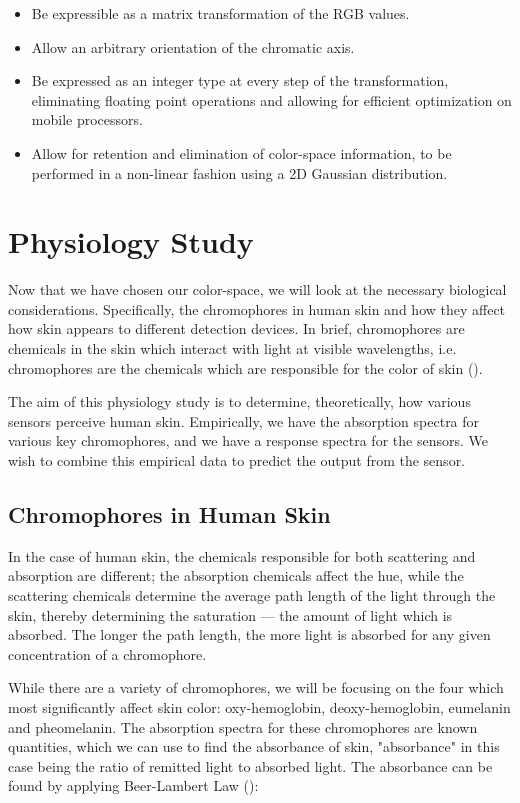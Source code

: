 \begin{itemize}
\item Be expressible as a matrix transformation of the RGB values.
\item Allow an arbitrary orientation of the chromatic axis.
\item Be expressed as an integer type at every step of the transformation, eliminating floating point operations and allowing for efficient optimization on mobile processors.
\item Allow for retention and elimination of color-space information, to be performed in a non-linear fashion using a 2D Gaussian distribution.
\end{itemize}


\section{Physiology Study}\label{sec:PhysiologyStudy}

Now that we have chosen our color-space, we will look at the necessary biological considerations. Specifically, the chromophores in human skin and how they affect how skin appears to different detection devices. In brief, chromophores are chemicals in the skin which interact with light at visible wavelengths, i.e. chromophores are the chemicals which are responsible for the color of skin (\cite{Anderson1981}).

The aim of this physiology study is to determine, theoretically, how various sensors perceive human skin. Empirically, we have the absorption spectra for various key chromophores, and we have a response spectra for the sensors. We wish to combine this empirical data to predict the output from the sensor. 

\subsection{Chromophores in Human Skin}

In the case of human skin, the chemicals responsible for both scattering and absorption are different; the absorption chemicals affect the hue, while the scattering chemicals determine the average path length of the light through the skin, thereby determining the saturation --- the amount of light which is absorbed. The longer the path length, the more light is absorbed for any given concentration of a chromophore. 

While there are a variety of chromophores, we will be focusing on the four which most significantly affect skin color: oxy-hemoglobin, deoxy-hemoglobin, eumelanin and pheomelanin. The absorption spectra for these chromophores are known quantities, which we can use to find the absorbance of skin, "absorbance" in this case being the ratio of remitted light to absorbed light. The absorbance can be found by applying Beer-Lambert Law (\cite{Clark2007}):

